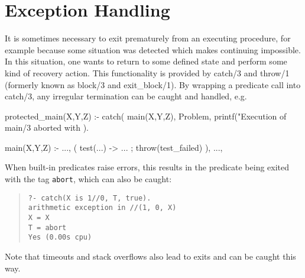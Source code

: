 


\section{Exception Handling}

It is sometimes necessary to exit prematurely from an executing
procedure, for example because some situation was detected which
makes continuing impossible.
In this situation, one wants to return to some defined state and
perform some kind of recovery action.
This functionality is provided by catch/3 and throw/1
(formerly known as block/3 and exit_block/1).
By wrapping a predicate call into catch/3, any irregular termination
can be caught and handled, e.g.
\begin{code}
protected_main(X,Y,Z) :-
    catch(
        main(X,Y,Z),
        Problem,
        printf("Execution of main/3 aborted with %
    ).

main(X,Y,Z) :-
    ...,
    ( test(...) -> ... ; throw(test_failed) ),
    ...,
\end{code}
When built-in predicates raise errors, this results in the predicate
being exited with the tag \verb.abort., which can also be caught:
\begin{quote}\begin{verbatim}
?- catch(X is 1//0, T, true).
arithmetic exception in //(1, 0, X)
X = X
T = abort
Yes (0.00s cpu)
\end{verbatim}\end{quote}
Note that timeouts and stack overflows also lead to exits and can be
caught this way.


